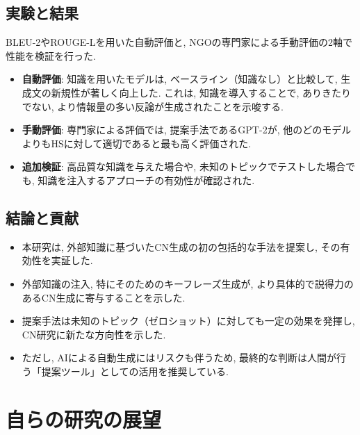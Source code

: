 \documentclass[dvipdfmx]{jsarticle}
\begin{document}
\vspace{0.5em}

\subsection{実験と結果}

BLEU-2やROUGE-Lを用いた自動評価と, NGOの専門家による手動評価の2軸で性能を検証を行った.

\begin{itemize}
  \item \textbf{自動評価}: 知識を用いたモデルは, ベースライン（知識なし）と比較して, 生成文の新規性が著しく向上した.
        これは, 知識を導入することで, ありきたりでない, より情報量の多い反論が生成されたことを示唆する.

  \item \textbf{手動評価}: 専門家による評価では, 提案手法であるGPT-2が, 他のどのモデルよりもHSに対して適切であると最も高く評価された.

  \item \textbf{追加検証}: 高品質な知識を与えた場合や, 未知のトピックでテストした場合でも, 知識を注入するアプローチの有効性が確認された.
\end{itemize}

\vspace{0.5em}

\subsection{結論と貢献}

\begin{itemize}
  \item 本研究は, 外部知識に基づいたCN生成の初の包括的な手法を提案し, その有効性を実証した.
  \item 外部知識の注入, 特にそのためのキーフレーズ生成が, より具体的で説得力のあるCN生成に寄与することを示した.
  \item 提案手法は未知のトピック（ゼロショット）に対しても一定の効果を発揮し, CN研究に新たな方向性を示した.
  \item ただし, AIによる自動生成にはリスクも伴うため, 最終的な判断は人間が行う「提案ツール」としての活用を推奨している.
\end{itemize}

\vspace{1em}

\section{自らの研究の展望}
\end{document}
